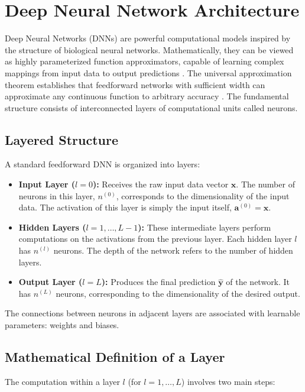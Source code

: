 \documentclass[11pt,twoside,openright]{report}
\begin{document}
\section{Deep Neural Network Architecture}

Deep Neural Networks (DNNs) are powerful computational models inspired by the structure of biological neural networks. Mathematically, they can be viewed as highly parameterized function approximators, capable of learning complex mappings from input data to output predictions \cite{goodfellow2016deep}. The universal approximation theorem establishes that feedforward networks with sufficient width can approximate any continuous function to arbitrary accuracy \cite{hornik1989multilayer}. The fundamental structure consists of interconnected layers of computational units called neurons.

\subsection{Layered Structure}
A standard feedforward DNN is organized into layers:
\begin{itemize}
    \item \textbf{Input Layer ($l=0$):} Receives the raw input data vector $\mathbf{x}$. The number of neurons in this layer, $n^{(0)}$, corresponds to the dimensionality of the input data. The activation of this layer is simply the input itself, $\mathbf{a}^{(0)} = \mathbf{x}$.
    \item \textbf{Hidden Layers ($l=1, \dots, L-1$):} These intermediate layers perform computations on the activations from the previous layer. Each hidden layer $l$ has $n^{(l)}$ neurons. The depth of the network refers to the number of hidden layers.
    \item \textbf{Output Layer ($l=L$):} Produces the final prediction $\hat{\mathbf{y}}$ of the network. It has $n^{(L)}$ neurons, corresponding to the dimensionality of the desired output.
\end{itemize}
The connections between neurons in adjacent layers are associated with learnable parameters: weights and biases.

\subsection{Mathematical Definition of a Layer}
The computation within a layer $l$ (for $l=1, \dots, L$) involves two main steps:
\end{document}
